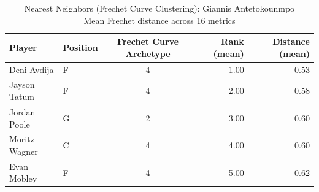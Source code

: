 \begin{table}[t]
\caption*{
{\fontsize{20}{25} Nearest Neighbors (Frechet Curve Clustering): Giannis Antetokounmpo\fontsize{12}{15}\selectfont } \\ 
{\fontsize{14}{17}\selectfont  Mean Frechet distance across 16 metrics\fontsize{12}{15}\selectfont }
} 
\fontsize{12.0pt}{14.0pt}\selectfont
\begin{tabular*}{\linewidth}{@{\extracolsep{\fill}}llcrr}
\toprule
Player & Position & Frechet Curve Archetype & Rank (mean) & Distance (mean) \\ 
\midrule\addlinespace[2.5pt]
Deni Avdija & F & 4 & 1.00 & 0.53 \\ 
Jayson Tatum & F & 4 & 2.00 & 0.58 \\ 
Jordan Poole & G & 2 & 3.00 & 0.60 \\ 
Moritz Wagner & C & 4 & 4.00 & 0.60 \\ 
Evan Mobley & F & 4 & 5.00 & 0.62 \\ 
\bottomrule
\end{tabular*}
\end{table}

